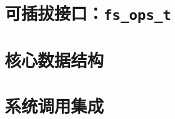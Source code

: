 
\section{可插拔接口：\texttt{fs\_ops\_t}}
\label{sec:vfs-interface}


\section{核心数据结构}
\label{sec:vfs-structs}


\section{系统调用集成}
\label{sec:vfs-syscall}

